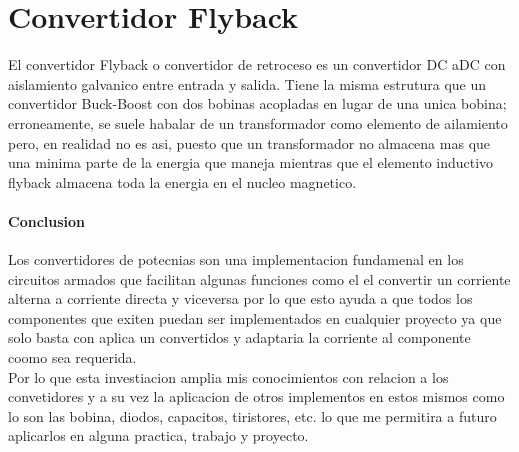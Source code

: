 \documentclass[12pt,a4paper]{report}
\begin{document}
\section{Convertidor Flyback}
El convertidor Flyback o convertidor de retroceso es un convertidor DC aDC con aislamiento galvanico entre entrada y salida. Tiene la misma estrutura que un convertidor Buck-Boost con dos bobinas acopladas en lugar de una unica bobina; erroneamente, se suele habalar de un transformador como elemento de ailamiento pero, en realidad no es asi, puesto que un transformador no almacena mas que una minima parte de la energia que maneja mientras que el elemento inductivo flyback almacena toda la energia en el nucleo magnetico.
\paragraph{Conclusion}
Los convertidores de potecnias son una implementacion fundamenal en los circuitos armados que facilitan algunas funciones como el el convertir un corriente alterna a corriente directa y viceversa por lo que esto ayuda a que todos los componentes que exiten puedan ser implementados en cualquier proyecto ya que solo basta con aplica un convertidos y adaptaria la corriente al componente coomo sea requerida.
\\
Por lo que esta investiacion amplia mis conocimientos con relacion a los convetidores y a su vez la aplicacion de otros implementos en estos mismos como lo son las bobina, diodos, capacitos, tiristores, etc. lo que me permitira a futuro aplicarlos en alguna practica, trabajo y proyecto.

 



\end{document}
